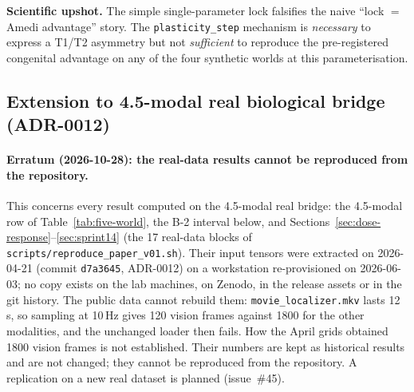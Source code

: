 \documentclass{article}
\begin{document}
\textbf{Scientific upshot.} The simple single-parameter lock
falsifies the naive ``lock $=$ Amedi advantage'' story. The
\texttt{plasticity\_step} mechanism is \emph{necessary} to express
a T1/T2 asymmetry but not \emph{sufficient} to reproduce the
pre-registered congenital advantage on any of the four synthetic
worlds at this parameterisation.

\subsection{Extension to 4.5-modal real biological bridge (ADR-0012)}
\label{sec:bridge}

\paragraph{Erratum (2026-10-28): the real-data results cannot be
reproduced from the repository.} This concerns every result computed
on the 4.5-modal real bridge: the 4.5-modal row of
Table~\ref{tab:five-world}, the B-2 interval below, and
Sections~\ref{sec:dose-response}--\ref{sec:sprint14} (the 17
real-data blocks of \texttt{scripts/reproduce\_paper\_v01.sh}).
Their input tensors were extracted on 2026-04-21 (commit \texttt{d7a3645}, ADR-0012) on a
workstation re-provisioned on 2026-06-03; no copy exists on the lab
machines, on Zenodo, in the release assets or in the git history. The
public data cannot rebuild them: \texttt{movie\_localizer.mkv} lasts
12\,s, so sampling at 10\,Hz gives 120 vision frames against 1800 for
the other modalities, and the unchanged loader then fails. How the
April grids obtained 1800 vision frames is not established. Their
numbers are kept as historical results and are not changed; they
cannot be reproduced from the repository. A replication on a new real
dataset is planned (issue~\#45).
\end{document}
